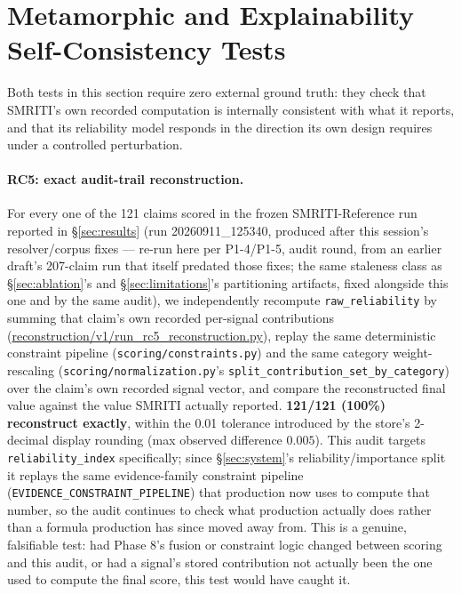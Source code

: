 \section{Metamorphic and Explainability Self-Consistency Tests}
\label{sec:metamorphic}

Both tests in this section require zero external ground truth: they check
that SMRITI's own recorded computation is internally consistent with what
it reports, and that its reliability model responds in the direction its
own design requires under a controlled perturbation.

\paragraph{RC5: exact audit-trail reconstruction.} For every one of the
121 claims scored in the frozen SMRITI-Reference run reported in
\S\ref{sec:results} (run 20260911\_125340, produced after this session's
resolver/corpus fixes --- re-run here per P1-4/P1-5, audit round, from an
earlier draft's 207-claim run that itself predated those fixes; the same
staleness class as \S\ref{sec:ablation}'s and \S\ref{sec:limitations}'s
partitioning artifacts, fixed alongside this one and by the same
audit), we independently
recompute \texttt{raw\_reliability} by summing that claim's own recorded
per-signal contributions (\url{reconstruction/v1/run_rc5_reconstruction.py}),
replay the same deterministic constraint
pipeline (\texttt{scoring/constraints.py}) and the same category
weight-rescaling (\texttt{scoring/normalization.py}'s
\texttt{split\_contribution\_set\_by\_category}) over the claim's own
recorded signal vector, and compare the reconstructed final value
against the value SMRITI actually reported. \textbf{121/121 (100\%)
reconstruct exactly}, within the 0.01 tolerance introduced by the
store's 2-decimal display rounding (max observed difference $0.005$).
This audit targets \texttt{reliability\_index}
specifically; since \S\ref{sec:system}'s reliability/importance split it
replays the same evidence-family constraint pipeline
(\texttt{EVIDENCE\_CONSTRAINT\_PIPELINE}) that production now uses to
compute that number, so the audit continues to check what production
actually does rather than a formula production has since moved away from.
This is a genuine, falsifiable test: had Phase 8's fusion or constraint
logic changed between scoring and this audit, or had a signal's stored
contribution not actually been the one used to compute the final score,
this test would have caught it.

